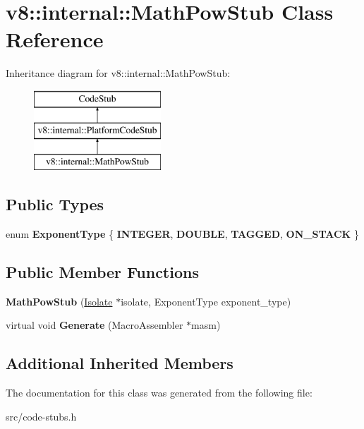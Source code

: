 \hypertarget{classv8_1_1internal_1_1_math_pow_stub}{}\section{v8\+:\+:internal\+:\+:Math\+Pow\+Stub Class Reference}
\label{classv8_1_1internal_1_1_math_pow_stub}
Inheritance diagram for v8\+:\+:internal\+:\+:Math\+Pow\+Stub\+:\begin{figure}[H]
\begin{center}
\leavevmode
\includegraphics[height=3.000000cm]{classv8_1_1internal_1_1_math_pow_stub}
\end{center}
\end{figure}
\subsection*{Public Types}
\begin{DoxyCompactItemize}
\item 
\hypertarget{classv8_1_1internal_1_1_math_pow_stub_a4d91d3bc7b619aa315c496c8c1e24c2c}{}enum {\bfseries Exponent\+Type} \{ {\bfseries I\+N\+T\+E\+G\+E\+R}, 
{\bfseries D\+O\+U\+B\+L\+E}, 
{\bfseries T\+A\+G\+G\+E\+D}, 
{\bfseries O\+N\+\_\+\+S\+T\+A\+C\+K}
 \}\label{classv8_1_1internal_1_1_math_pow_stub_a4d91d3bc7b619aa315c496c8c1e24c2c}

\end{DoxyCompactItemize}
\subsection*{Public Member Functions}
\begin{DoxyCompactItemize}
\item 
\hypertarget{classv8_1_1internal_1_1_math_pow_stub_a335e2c420956b65d5c11c4f03143b7e0}{}{\bfseries Math\+Pow\+Stub} (\hyperlink{classv8_1_1internal_1_1_isolate}{Isolate} $\ast$isolate, Exponent\+Type exponent\+\_\+type)\label{classv8_1_1internal_1_1_math_pow_stub_a335e2c420956b65d5c11c4f03143b7e0}

\item 
\hypertarget{classv8_1_1internal_1_1_math_pow_stub_aebfe43c90af736e9fea8e87528c3bd61}{}virtual void {\bfseries Generate} (Macro\+Assembler $\ast$masm)\label{classv8_1_1internal_1_1_math_pow_stub_aebfe43c90af736e9fea8e87528c3bd61}

\end{DoxyCompactItemize}
\subsection*{Additional Inherited Members}


The documentation for this class was generated from the following file\+:\begin{DoxyCompactItemize}
\item 
src/code-\/stubs.\+h\end{DoxyCompactItemize}
